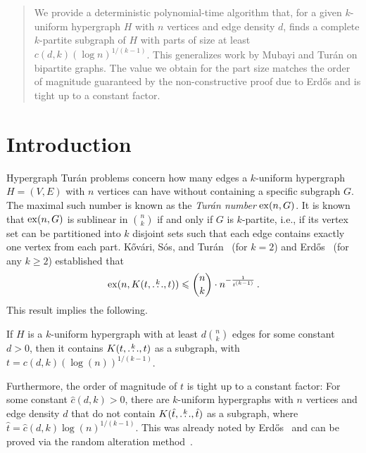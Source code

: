 \begin{abstract}
We provide a deterministic polynomial-time algorithm that, for a given $k$-uniform hypergraph $H$ with $n$ vertices and edge density $d$,
finds a complete $k$-partite subgraph of $H$ with parts of size at least ${c(d, k)(\log n)^{1/(k-1)}}$.
This generalizes work by Mubayi and Tur\'{a}n on bipartite graphs.
The value we obtain for the part size matches the order of magnitude guaranteed by the non-constructive proof due to
Erd\H{o}s and is tight up to a constant factor.
\end{abstract}

\maketitle


\section{Introduction}\label{sec:introduction}

Hypergraph Tur\'{a}n problems concern how many edges a $k$-uniform hypergraph $H = (V, E)$ with $n$ vertices can have without containing a specific subgraph $G$.
The maximal such number is known as the \emph{Tur\'{a}n number} $\mathrm{ex}(n, G)$.
It is known~\cite{keevash2011hypergraph}
that $\mathrm{ex}(n, G)$ is sublinear in $\binom{n}{k}$ if and only if $G$ is $k$-partite, i.e.,
if its vertex set can be partitioned into $k$ disjoint sets such that each edge contains exactly one vertex from each part.
Kőv\'{a}ri, S\'{o}s, and Tur\'{a}n~\cite{Kovari1954} (for $k=2$) and
Erd\H{o}s~\cite{Erdos1964} (for any $k \geq 2$) established that
\[ \label{eq:erdos64-intro}
    \mathrm{ex}(n, K(t, \overset{k}{\dots}, t)) \leqslant \binom{n}{k} \cdot n^{-\frac{1}{t^{(k-1)}}}\,.
\]
This result implies the following.

\begin{remark} \label{rk:order}
    If $H$ is a $k$-uniform hypergraph with at least $d \binom{n}{k}$ edges for some constant $d > 0$, then it contains $K(t, \overset{k}{\dots}, t)$
    as a subgraph, with $t = c(d, k) (\log(n))^{1/(k-1)}$.
\end{remark}

Furthermore, the order of magnitude of $t$ is tight up to a constant factor:
For some constant $\hat{c}(d, k) > 0$,
there are $k$-uniform hypergraphs with $n$ vertices and edge density
$d$ that do not contain $K(\hat{t}, \overset{k}{\dots}, \hat{t})$ as a subgraph, where
$\hat{t} = \hat{c}(d, k)\log(n)^{1/(k-1)}$.
This was already noted by Erd\H{o}s~\cite{Erdos1964} and can be proved via the random alteration method~\cite{alon2016probabilistic}.


